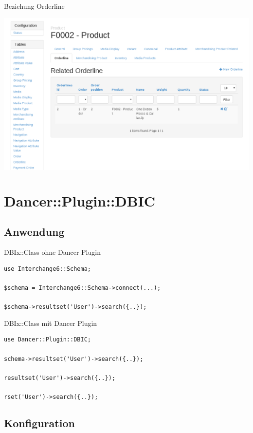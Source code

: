 \begin{frame}{Beziehung Orderline}
  \begin{center}
    \includegraphics[width=\textwidth,height=0.8\textheight,keepaspectratio]{images/product-related.png}
  \end{center}
\end{frame}

\section{Dancer::Plugin::DBIC}
\subsection{Anwendung}
\begin{frame}[fragile]{DBIx::Class ohne Dancer Plugin}
\begin{lstlisting}
use Interchange6::Schema;

$schema = Interchange6::Schema->connect(...);

$schema->resultset('User')->search({..});
\end{lstlisting}
\end{frame}

\begin{frame}[fragile]{DBIx::Class mit Dancer Plugin}
\begin{lstlisting}
use Dancer::Plugin::DBIC;

schema->resultset('User')->search({..});

resultset('User')->search({..});

rset('User')->search({..});
\end{lstlisting}
\end{frame}

\subsection{Konfiguration}

